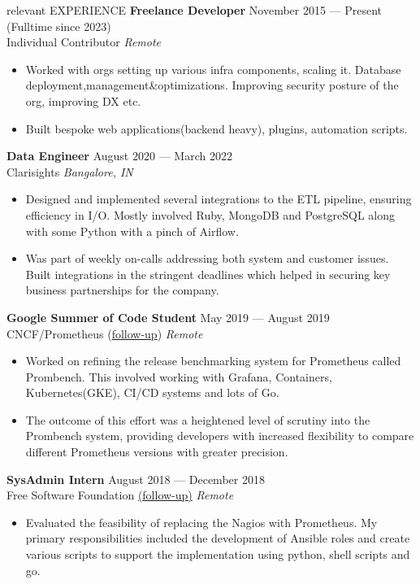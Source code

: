 \documentclass{resume} %
\begin{document}
\begin{rSection}{relevant EXPERIENCE}
  \textbf{Freelance Developer} \hfill November 2015 — Present (Fulltime since 2023)\\
  Individual Contributor \hfill \textit{Remote}
  \begin{itemize}
    \itemsep -3pt {}
    \item Worked with orgs setting up various infra components, scaling it. Database deployment,management\&optimizations. Improving security posture of the org, improving DX etc.
    \item Built bespoke web applications(backend heavy), plugins, automation scripts.
  \end{itemize}

  \textbf{Data Engineer} \hfill August 2020 — March 2022\\
  Clarisights \hfill \textit{Bangalore, IN}
  \begin{itemize}
    \itemsep -3pt {}
    \item Designed and implemented several integrations to the ETL pipeline, ensuring efficiency in I/O. Mostly involved Ruby, MongoDB and PostgreSQL along with some Python with a pinch of Airflow.
    \item Was part of weekly on-calls addressing both system and customer issues. Built integrations in the stringent deadlines which helped in securing key business partnerships for the company.
  \end{itemize}

  \textbf{Google Summer of Code Student} \hfill May 2019 — August 2019\\
  CNCF/Prometheus (\href{https://blog.geekodour.org/posts/gsoc19/}{follow-up}) \hfill \textit{Remote}
  \begin{itemize}
    \itemsep -3pt {}
    \item Worked on refining the release benchmarking system for Prometheus called Prombench. This involved working with Grafana, Containers, Kubernetes(GKE), CI/CD systems and lots of Go.
    \item The outcome of this effort was a heightened level of scrutiny into the Prombench system, providing developers with increased flexibility to compare different Prometheus versions with greater precision.
  \end{itemize}

  \textbf{SysAdmin Intern} \hfill August 2018 — December 2018\\
  Free Software Foundation \href{https://www.fsf.org/blogs/sysadmin/what-i-learned-during-my-internship-with-the-fsf-tech-team}{(follow-up)} \hfill \textit{Remote}
  \begin{itemize}
    \itemsep -3pt {}
    \item Evaluated the feasibility of replacing the Nagios with Prometheus. My primary responsibilities included the development of Ansible roles and create various scripts to support the implementation using python, shell scripts and go.
  \end{itemize}

\end{rSection}
\end{document}
